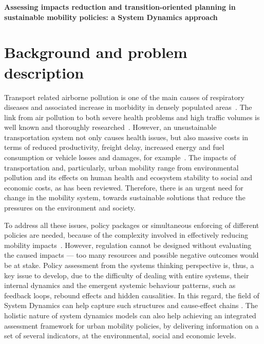 \documentclass[a4paper,fontsize=11pt,bibliography=totoc]{scrartcl}
\newcommand{\titlemake}[2]{%
		\begin{center}
			\parbox{#1\linewidth}{\centering\Large\sffamily\bfseries{#2}}
		\end{center}
}
\begin{document}
\pagestyle{fancy}
\fancyhf{} %
\rhead{\footnotesize \today}
\rfoot{\footnotesize \thepage}

\titlemake{1}{ %
Assessing impacts reduction and transition-oriented planning in sustainable mobility policies: a System Dynamics approach
}

\section{Background and problem description}
\label{s:background}
Transport related airborne pollution is one of the main causes of respiratory diseases and associated increase in morbidity in densely populated areas~\parencite{vimercati2011_Trafficrelatedair,who2006_Airqualityguidelines}. The link from air pollution to both severe health problems and high traffic volumes is well known and thoroughly researched~\parencite{who2006_Airqualityguidelines}. However, an unsustainable transportation system not only causes health issues, but also massive costs in terms of reduced productivity, freight delay, increased energy and fuel consumption or vehicle losses and damages, for example~\parencite{li-zeng2012_SocialCostTraffic}. The impacts of transportation and, particularly, urban mobility range from environmental pollution and its effects on human health and ecosystem stability to social and economic costs, as has been reviewed. Therefore, there is an urgent need for change in the mobility system, towards sustainable solutions that reduce the pressures on the environment and society.

To address all these issues, policy packages or simultaneous enforcing of different policies are needed, because of the complexity involved in effectively reducing mobility impacts~\parencite[ch. 3, p. 45]{garciasierra2014_Travelbehaviourenvironmental}. However, regulation cannot be designed without evaluating the caused impacts --- too many resources and possible negative outcomes would be at stake. Policy assessment from the systems thinking perspective is, thus, a key issue to develop, due to the difficulty of dealing with entire systems, their internal dynamics and the emergent systemic behaviour patterns, such as feedback loops, rebound effects and hidden causalities. In this regard, the field of System Dynamics can help capture such structures and cause-effect chains \parencite{hjorth2006_Navigatingtowardssustainable}. The holistic nature of system dynamics models can also help achieving an integrated assessment framework for urban mobility policies, by delivering information on a set of several indicators, at the environmental, social and economic levels.
\end{document}
